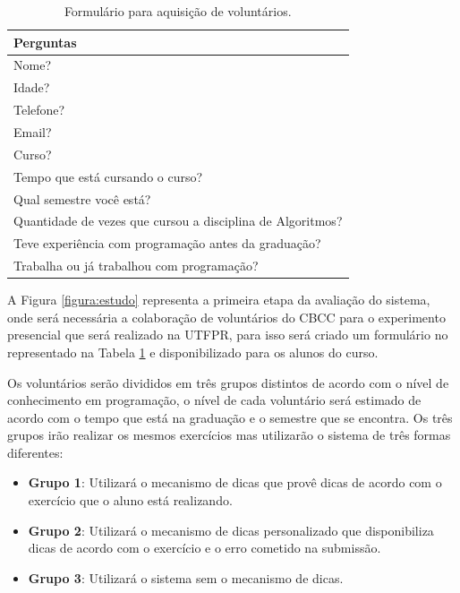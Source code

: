 \begin{table}[]
	\centering
	\captionsetup{justification=centering}
	\caption{Formulário para aquisição de voluntários.}
	\label{tabela:formulário}
	\begin{tabular}{l}
		\hline
		Perguntas                        \\ \hline
		Nome?                            \\
		Idade?                           \\
		Telefone?                        \\
		Email?                           \\
		Curso?                           \\
		Tempo que está cursando o curso? \\
		Qual semestre você está?         \\ 
		Quantidade de vezes que cursou a disciplina de Algoritmos?  \\ 
		Teve experiência com programação antes da graduação? \\
		Trabalha ou já trabalhou com programação? \\ \hline
	\end{tabular}
\end{table}

A Figura \ref{figura:estudo} representa a primeira etapa da avaliação do sistema, onde será necessária a colaboração de voluntários do CBCC para o experimento presencial que será realizado na UTFPR, para isso será criado um formulário no  representado na Tabela \ref{tabela:formulário} e disponibilizado  para os alunos do curso.

Os voluntários serão divididos em três grupos distintos de acordo com o nível de conhecimento em programação, o nível de cada voluntário será estimado de acordo com o tempo que está na graduação e o semestre que se encontra. Os três grupos irão realizar os mesmos exercícios mas utilizarão o sistema de três formas diferentes:

\begin{itemize}
	\item \textbf{Grupo 1}: Utilizará o mecanismo de dicas que provê dicas de acordo com o exercício que o aluno está realizando.
	
	\item \textbf{Grupo 2}: Utilizará o mecanismo de dicas personalizado que disponibiliza dicas de acordo com o exercício e o erro cometido na submissão.
	
	\item \textbf{Grupo 3}: Utilizará o sistema sem o mecanismo de dicas.
\end{itemize}

